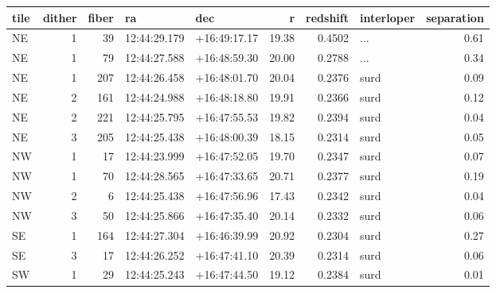 \begin{tabular}{lrrllrrlr}
\toprule
tile &  dither &  fiber &            ra &           dec &      r &  redshift & interloper &  separation \\
\midrule
  NE &       1 &     39 &  12:44:29.179 &  +16:49:17.17 &  19.38 &    0.4502 &        ... &        0.61 \\
  NE &       1 &     79 &  12:44:27.588 &  +16:48:59.30 &  20.00 &    0.2788 &        ... &        0.34 \\
  NE &       1 &    207 &  12:44:26.458 &  +16:48:01.70 &  20.04 &    0.2376 &       surd &        0.09 \\
  NE &       2 &    161 &  12:44:24.988 &  +16:48:18.80 &  19.91 &    0.2366 &       surd &        0.12 \\
  NE &       2 &    221 &  12:44:25.795 &  +16:47:55.53 &  19.82 &    0.2394 &       surd &        0.04 \\
  NE &       3 &    205 &  12:44:25.438 &  +16:48:00.39 &  18.15 &    0.2314 &       surd &        0.05 \\
  NW &       1 &     17 &  12:44:23.999 &  +16:47:52.05 &  19.70 &    0.2347 &       surd &        0.07 \\
  NW &       1 &     70 &  12:44:28.565 &  +16:47:33.65 &  20.71 &    0.2377 &       surd &        0.19 \\
  NW &       2 &      6 &  12:44:25.438 &  +16:47:56.96 &  17.43 &    0.2342 &       surd &        0.04 \\
  NW &       3 &     50 &  12:44:25.866 &  +16:47:35.40 &  20.14 &    0.2332 &       surd &        0.06 \\
  SE &       1 &    164 &  12:44:27.304 &  +16:46:39.99 &  20.92 &    0.2304 &       surd &        0.27 \\
  SE &       3 &     17 &  12:44:26.252 &  +16:47:41.10 &  20.39 &    0.2314 &       surd &        0.06 \\
  SW &       1 &     29 &  12:44:25.243 &  +16:47:44.50 &  19.12 &    0.2384 &       surd &        0.01 \\
\bottomrule
\end{tabular}
